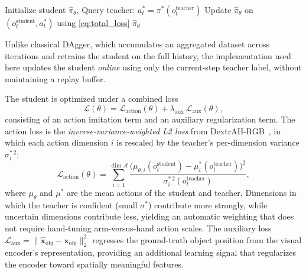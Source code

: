 \begin{algorithm}[htb]
\caption{Online SafeDAgger with direct action-disagreement gating.  indicate the safety-gating modifications that distinguish SafeDAgger from vanilla DAgger.}
\label{alg:safedagger}
\begin{algorithmic}[1]
\State Initialize student $\hat{\pi}_{\theta}$, 
    \State Query teacher: $a_t^* = \pi^*(o_t^{\text{teacher}})$
    \State {}
        \State {} 
    \Else
        \State {} 
    \EndIf
    \State Update $\hat{\pi}_{\theta}$ on $(o_t^{\text{student}}, a_t^*)$ using \cref{eq:total_loss}
\EndFor
\State \Return $\hat{\pi}_{\theta}$
\end{algorithmic}
\end{algorithm}

Unlike classical DAgger, which accumulates an aggregated dataset across iterations and retrains the student on the full history, the implementation used here updates the student \emph{online} using only the current-step teacher label, without maintaining a replay buffer.

The student is optimized under a combined loss
%
\begin{equation}\label{eq:total_loss}
    \mathcal{L}(\theta) = \mathcal{L}_{\text{action}}(\theta) + \lambda_{\text{aux}}\,\mathcal{L}_{\text{aux}}(\theta),
\end{equation}
%
consisting of an action imitation term and an auxiliary regularization term.
The action loss is the \emph{inverse-variance-weighted L2 loss} from DextrAH-RGB~\cite{Singh2025}, in which each action dimension $i$ is rescaled by the teacher's per-dimension variance $\sigma^{*\,2}_i$:
%
\begin{equation}\label{eq:wl2_loss}
    \mathcal{L}_{\text{action}}(\theta) = \sum_{i=1}^{\dim \mathcal{A}} \frac{\bigl(\mu_{\theta,i}(o_t^{\text{student}}) - \mu^*_i(o_t^{\text{teacher}})\bigr)^2}{\sigma^{*\,2}_i(o_t^{\text{teacher}})},
\end{equation}
%
where $\mu_\theta$ and $\mu^*$ are the mean actions of the student and teacher.
Dimensions in which the teacher is confident (small $\sigma^*$) contribute more strongly, while uncertain dimensions contribute less, yielding an automatic weighting that does not require hand-tuning arm-versus-hand action scales.
The auxiliary loss $\mathcal{L}_{\text{aux}} = \|\hat{\mathbf{x}}_{\text{obj}} - \mathbf{x}_{\text{obj}}\|_2^2$ regresses the ground-truth object position from the visual encoder's representation, providing an additional learning signal that regularizes the encoder toward spatially meaningful features.

